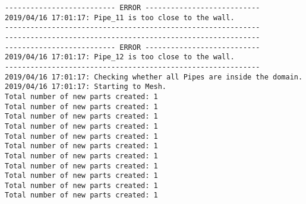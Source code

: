 \documentclass{article}
\begin{document}
{\begin{verbatim}
-------------------------- ERROR ---------------------------
2019/04/16 17:01:17: Pipe_11 is too close to the wall.
------------------------------------------------------------
------------------------------------------------------------
-------------------------- ERROR ---------------------------
2019/04/16 17:01:17: Pipe_12 is too close to the wall.
------------------------------------------------------------
2019/04/16 17:01:17: Checking whether all Pipes are inside the domain.
2019/04/16 17:01:17: Starting to Mesh.
Total number of new parts created: 1
Total number of new parts created: 1
Total number of new parts created: 1
Total number of new parts created: 1
Total number of new parts created: 1
Total number of new parts created: 1
Total number of new parts created: 1
Total number of new parts created: 1
Total number of new parts created: 1
Total number of new parts created: 1
Total number of new parts created: 1
\end{verbatim}
}
\clearpage
\end{document}
